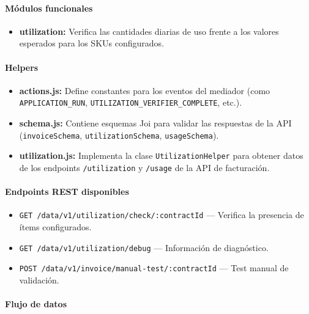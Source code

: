 \paragraph{Módulos funcionales}
\begin{itemize}
    \item \textbf{utilization:} Verifica las cantidades diarias de uso frente a los valores
          esperados para los SKUs configurados.
\end{itemize}

\paragraph{Helpers}
\begin{itemize}
    \item \textbf{actions.js:} Define constantes para los eventos del mediador (como
          \texttt{APPLICATION\_RUN}, \texttt{UTILIZATION\_VERIFIER\_COMPLETE}, etc.).

    \item \textbf{schema.js:} Contiene esquemas Joi para validar las respuestas de la API
          (\texttt{invoiceSchema}, \texttt{utilizationSchema}, \texttt{usageSchema}).

    \item \textbf{utilization.js:} Implementa la clase \texttt{UtilizationHelper} para obtener
          datos de los endpoints \texttt{/utilization} y \texttt{/usage} de la API de facturación.
\end{itemize}

\paragraph{Endpoints REST disponibles}

\begin{itemize}
    \item \texttt{GET /data/v1/utilization/check/:contractId} --- Verifica la presencia de ítems configurados.
    \item \texttt{GET /data/v1/utilization/debug} --- Información de diagnóstico.
    \item \texttt{POST /data/v1/invoice/manual-test/:contractId} --- Test manual de validación.
\end{itemize}

\paragraph{Flujo de datos}

